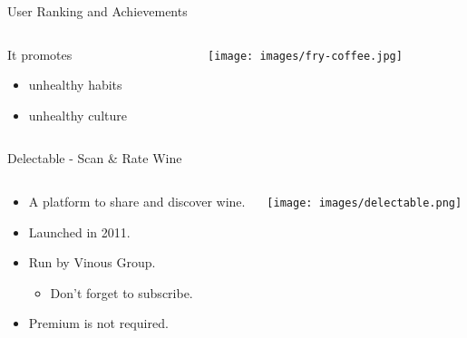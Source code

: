 \documentclass[presentation,aspectratio=169,smaller]{beamer}
\begin{document}
\begin{frame}[label={sec:org8da8133}]{User Ranking and Achievements}
\begin{columns}
\begin{column}{0.4\columnwidth}
It promotes

\begin{itemize}
\item unhealthy \alert{habits}
\item unhealthy \alert{culture}
\end{itemize}
\end{column}
\begin{column}{0.6\columnwidth}
\begin{center}
\texttt{[image: images/fry-coffee.jpg]}
\end{center}
\end{column}
\end{columns}
\end{frame}
\begin{frame}[label={sec:orgc187ed2}]{Delectable - Scan \& Rate Wine}
\begin{columns}
\begin{column}{0.6\columnwidth}
\begin{itemize}
\item A platform to share and discover wine.
\item Launched in 2011.
\item Run by Vinous Group.
\begin{itemize}
\item Don't forget to subscribe.
\end{itemize}
\item Premium is not required.
\end{itemize}
\end{column}
\begin{column}{0.4\columnwidth}
\begin{center}
\texttt{[image: images/delectable.png]}
\end{center}
\end{column}
\end{columns}
\end{frame}
\end{document}
